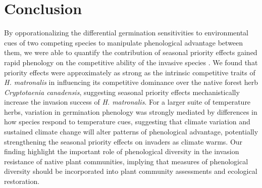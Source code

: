 \documentclass{article}\usepackage[]{graphicx}\usepackage[]{color}
\begin{document}
{\section*{Conclusion}
By opporationalizing the differential germination sensitivities to environmental cues of two competing species to manipulate phenological advantage between them, we were able to quantify the contribution of seasonal priority effects gained rapid phenology on the competitive ability of the invasive species . We found that priority effects were approximately as strong as the intrinsic competitive traits of \textit{H. matronalis} in influencing its competitive dominance over the native forest herb \textit{Cryptotaenia canadensis}, suggesting seasonal priority effects mechanistically increase the invasion success of \textit{H. matronalis}. For a larger suite of temperature herbs, variation in germination phenology was strongly mediated by differences in how species respond to temperature cues, suggesting that climate variation and sustained climate change will alter patterns of phenological advantage, potentially strengthening the seasonal priority effects on invaders as climate warms. Our finding highlight the important role of phenological diversity in the invasion resistance of native plant communities, implying that measures of phenological diversity should be incorporated into plant community assessments and ecological restoration. 





}
\end{document}

